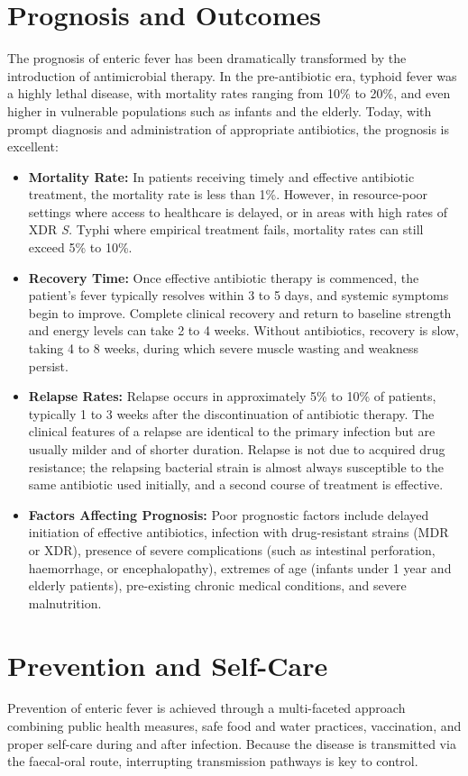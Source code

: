 \section*{Prognosis and Outcomes}
The prognosis of enteric fever has been dramatically transformed by the introduction of antimicrobial therapy. In the pre-antibiotic era, typhoid fever was a highly lethal disease, with mortality rates ranging from 10\% to 20\%, and even higher in vulnerable populations such as infants and the elderly. Today, with prompt diagnosis and administration of appropriate antibiotics, the prognosis is excellent:
\begin{itemize}
\item \textbf{Mortality Rate:} In patients receiving timely and effective antibiotic treatment, the mortality rate is less than 1\%. However, in resource-poor settings where access to healthcare is delayed, or in areas with high rates of XDR \textit{S.} Typhi where empirical treatment fails, mortality rates can still exceed 5\% to 10\%.
\item \textbf{Recovery Time:} Once effective antibiotic therapy is commenced, the patient's fever typically resolves within 3 to 5 days, and systemic symptoms begin to improve. Complete clinical recovery and return to baseline strength and energy levels can take 2 to 4 weeks. Without antibiotics, recovery is slow, taking 4 to 8 weeks, during which severe muscle wasting and weakness persist.
\item \textbf{Relapse Rates:} Relapse occurs in approximately 5\% to 10\% of patients, typically 1 to 3 weeks after the discontinuation of antibiotic therapy. The clinical features of a relapse are identical to the primary infection but are usually milder and of shorter duration. Relapse is not due to acquired drug resistance; the relapsing bacterial strain is almost always susceptible to the same antibiotic used initially, and a second course of treatment is effective.
\item \textbf{Factors Affecting Prognosis:} Poor prognostic factors include delayed initiation of effective antibiotics, infection with drug-resistant strains (MDR or XDR), presence of severe complications (such as intestinal perforation, haemorrhage, or encephalopathy), extremes of age (infants under 1 year and elderly patients), pre-existing chronic medical conditions, and severe malnutrition.
\end{itemize}

\section*{Prevention and Self-Care}
Prevention of enteric fever is achieved through a multi-faceted approach combining public health measures, safe food and water practices, vaccination, and proper self-care during and after infection. Because the disease is transmitted via the faecal-oral route, interrupting transmission pathways is key to control.

